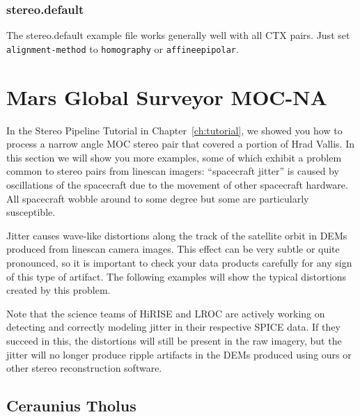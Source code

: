 \subsubsection*{stereo.default}

The stereo.default example file works generally well with all CTX
pairs. Just set \texttt{alignment-method} to \texttt{homography} or
\texttt{affineepipolar}.

\clearpage
\section{Mars Global Surveyor MOC-NA}

In the Stereo Pipeline Tutorial in Chapter~\ref{ch:tutorial}, we
showed you how to process a narrow angle \ac{MOC} stereo pair that
covered a portion of Hrad Vallis. In this section we will show you
more examples, some of which exhibit a problem common to stereo
pairs from linescan imagers: ``spacecraft jitter'' is caused by
oscillations of the spacecraft due to the movement of other spacecraft
hardware.  All spacecraft wobble around to some degree but some are
particularly susceptible.

Jitter causes wave-like distortions along the track of the satellite
orbit in \acp{DEM} produced from linescan camera images.  This effect can
be very subtle or quite pronounced, so it is important to check your
data products carefully for any sign of this type of artifact. The
following examples will show the typical distortions created by this
problem.

Note that the science teams of \ac{HiRISE} and \ac{LROC} are actively
working on detecting and correctly modeling jitter in their respective
SPICE data. If they succeed in this, the distortions will still
be present in the raw imagery, but the jitter will no longer produce
ripple artifacts in the DEMs produced using ours or other stereo
reconstruction software.

\subsection{Ceraunius Tholus}



